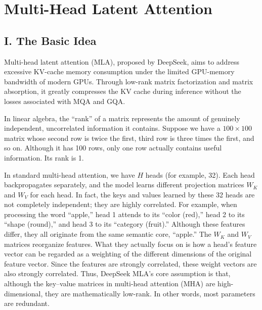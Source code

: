 \setcounter{section}{4}

\hypertarget{multi-head-latent-attention}{%
\section{Multi-Head Latent Attention}\label{multi-head-latent-attention}}

\hypertarget{i.-the-basic-idea}{%
\subsection{I. The Basic Idea}\label{i.-the-basic-idea}}

Multi-head latent attention (MLA), proposed by DeepSeek, aims to address excessive KV-cache memory consumption under the limited GPU-memory bandwidth of modern GPUs. Through low-rank matrix factorization and matrix absorption, it greatly compresses the KV cache during inference without the losses associated with MQA and GQA.

In linear algebra, the ``rank'' of a matrix represents the amount of genuinely independent, uncorrelated information it contains. Suppose we have a \(100\times100\) matrix whose second row is twice the first, third row is three times the first, and so on. Although it has 100 rows, only one row actually contains useful information. Its rank is 1.

In standard multi-head attention, we have \(H\) heads (for example, 32). Each head backpropagates separately, and the model learns different projection matrices \(W_K\) and \(W_V\) for each head. In fact, the keys and values learned by these 32 heads are not completely independent; they are highly correlated. For example, when processing the word ``apple,'' head 1 attends to its ``color (red),'' head 2 to its ``shape (round),'' and head 3 to its ``category (fruit).'' Although these features differ, they all originate from the same semantic core, ``apple.'' The \(W_K\) and \(W_V\) matrices reorganize features. What they actually focus on is how a head's feature vector can be regarded as a weighting of the different dimensions of the original feature vector. Since the features are strongly correlated, these weight vectors are also strongly correlated. Thus, DeepSeek MLA's core assumption is that, although the key--value matrices in multi-head attention (MHA) are high-dimensional, they are mathematically low-rank. In other words, most parameters are redundant.

